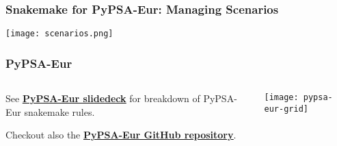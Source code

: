 \documentclass[10pt,aspectratio=169,dvipsnames]{beamer}
\begin{document}
\begin{frame}
  \frametitle{Snakemake for PyPSA-Eur: Managing Scenarios}

  \centering
  \texttt{[image: scenarios.png]}
\end{frame}



\begin{frame}
  \frametitle{PyPSA-Eur}

\begin{columns}[T]
  \begin{column}{4cm}

    \vspace{1.5cm}

    See \href{https://docs.google.com/presentation/d/1mzj4X9uuO58gUvkhVMRCFWOJUWbs6NR9SNZe-RIkkNo/edit?usp=sharing}{\bf\color{blue}\underline{PyPSA-Eur slidedeck}} for breakdown of PyPSA-Eur snakemake rules.

    \vspace{.5cm}

    Checkout also the \href{https://github.com/PyPSA/pypsa-eur}{\bf\color{blue}\underline{PyPSA-Eur GitHub repository}}.
  \end{column}

  \begin{column}{8cm}

    \vspace{.2cm}


\texttt{[image: pypsa-eur-grid]}
  \end{column}
\end{columns}


\end{frame}
\end{document}
